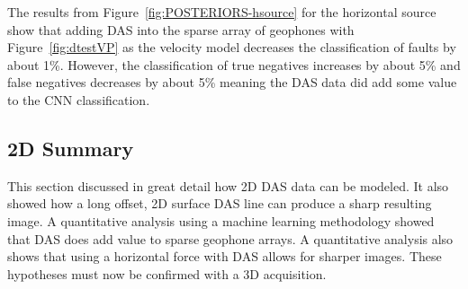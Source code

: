 The results from Figure~\ref{fig:POSTERIORS-hsource} for the horizontal source show that adding DAS into the sparse array of geophones with Figure~\ref{fig:dtestVP} as the velocity model decreases the classification of faults by about 1\%. However, the classification of true negatives increases by about 5\% and false negatives decreases by about 5\% meaning the DAS data did add some value to the CNN classification.


\subsection{2D Summary}
This section discussed in great detail how 2D DAS data can be modeled. It also showed how a long offset, 2D surface DAS line can produce a sharp resulting image. A quantitative analysis using a machine learning methodology showed that DAS does add value to sparse geophone arrays. A quantitative analysis also shows that using a horizontal force with DAS allows for sharper images. These hypotheses must now be confirmed with a 3D acquisition.

